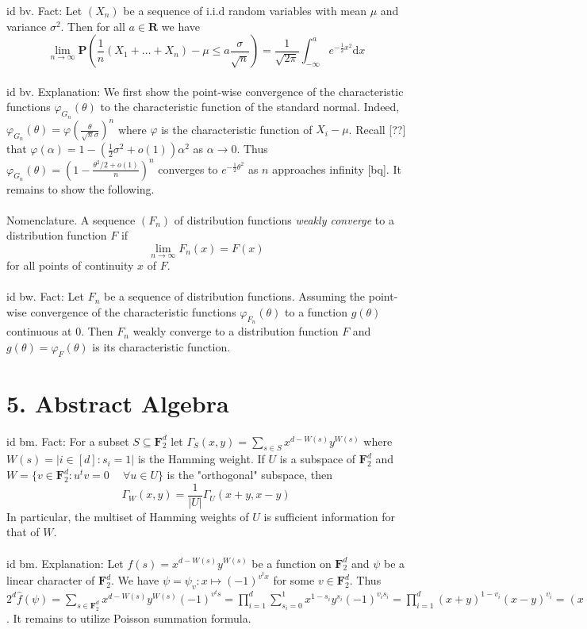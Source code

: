 \documentclass[oneside]{book}
\newcommand{\sub}{\subseteq}
\newcommand{\vphi}{\varphi}
\newcommand{\F}{\mathbf{F}}
\newcommand{\R}{\mathbf{R}}
\renewcommand{\P}{\mathbf{P}}
\newcommand{\set}[1]{\{ #1\}}
\newcommand{\fit}[1]{\left( #1\right)}
\newcommand{\abs}[1]{\left\lvert #1\right\rvert}
\renewcommand{\d}{\mathrm{d}}
\newcommand{\spc}{\phantom{-}}
\newcommand{\iid}{i.i.d }
\newcommand\chap[1]{%
  \chapter*{#1}%
  \addcontentsline{toc}{chapter}{#1}}
\begin{document}
id bv. Fact: Let $(X_n)$ be a sequence of \iid random variables with mean $\mu$ and variance $\sigma^2$. Then for all $a\in\R$ we have
$$\lim_{n\to\infty}\P\fit{\frac{1}{n}(X_1+\dots+X_n)-\mu \le a\frac{\sigma}{\sqrt{n}}}=\dfrac{1}{\sqrt{2\pi}}\int_{-\infty}^a e^{-\frac{1}{2}x^2}\d x$$
\\


id bv. Explanation: We first show the point-wise convergence of the characteristic functions $\vphi_{G_n}(\theta)$ to the characteristic function of the standard normal. Indeed, $\vphi_{G_n}(\theta)={\vphi\fit{\frac{\theta}{\sqrt{n}\sigma}}}^n$ where $\vphi$ is the characteristic function of $X_i-\mu$. Recall [??] that $\vphi(\alpha)=1-\fit{\frac{1}{2}\sigma^2+o(1)}\alpha^2$ as $\alpha\to 0$. Thus $\vphi_{G_n}(\theta)=\fit{1-{\frac{{\theta^2/2}+o(1)}{n}}}^n$ converges to $e^{-\frac{1}{2}\theta^2}$ as $n$ approaches infinity [bq]. It remains to show the following.   \\\\


Nomenclature. A sequence $(F_n)$ of distribution functions {\it weakly converge} to a distribution function $F$ if $$\lim_{n\to\infty}F_n(x)=F(x)$$
for all points of continuity $x$ of $F$.    \\\\


id bw. Fact: Let $F_n$ be a sequence of distribution functions. Assuming the point-wise convergence of the characteristic functions $\vphi_{F_n}(\theta)$ to a function $g(\theta)$ continuous at $0$. Then $F_n$ weakly converge to a distribution function $F$ and $g(\theta)=\vphi_F(\theta)$ is its characteristic function. 


\newpage
\chap{5. Abstract Algebra}
id bm. Fact: For a subset $S\sub \F_2^d$ let $\Gamma_S(x,y)=\displaystyle\sum_{s\in S}x^{d-W(s)}y^{W(s)}$ where $W(s)=\abs{i\in [d]:s_i=1}$ is the Hamming weight. If $U$ is a subspace of $\F_2^d$ and $W=\set{v\in \F_2^d: u^tv=0 \spc\forall u\in U}$ is the "orthogonal" subspace, then $$\Gamma_W(x,y)=\dfrac{1}{\abs{U}}\Gamma_U(x+y,x-y)$$
In particular, the multiset of Hamming weights of $U$ is sufficient information for that of $W$.    \\\\


id bm. Explanation: Let $f(s)=x^{d-W(s)}y^{W(s)}$ be a function on $\F_2^d$ and $\psi$ be a linear character of $\F_2^d$. We have $\psi=\psi_v:x\mapsto (-1)^{v^tx}$ for some $v\in \F_2^d$. Thus $2^d\hat{f}(\psi)=\sum_{s\in\F_2^d} x^{d-W(s)}y^{W(s)}(-1)^{v^ts}=\prod_{i=1}^d\sum_{s_i=0}^1  x^{1-s_i}y^{s_i}(-1)^{v_is_i}=\prod_{i=1}^d (x+y)^{1-v_i}(x-y)^{v_i}=(x+y)^{d-W(v)}(x-y)^{W(v)}$. It remains to utilize Poisson summation formula. \\\\
\end{document}
